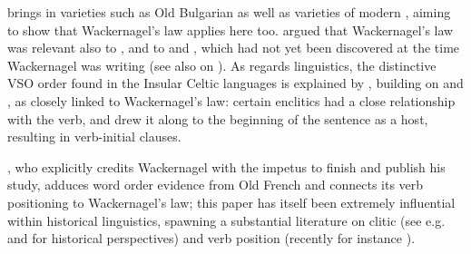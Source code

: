 \citet{Nilsson1904} brings in  varieties such as Old Bulgarian as well as varieties of modern , aiming to show that Wackernagel's law applies here too. 
\citet{Ivanov1958} argued that Wackernagel's law was relevant also to , and to  and , which had not yet been discovered at the time Wackernagel was writing (see also \citealp{Carruba1969,Hoffner1973,Garrett1990,Luraghi1998} on ). As regards  linguistics, the distinctive VSO order found in the Insular Celtic languages is explained by \citet{Watkins1963}, building on \citet{Vendryes1912} and \citet{Dillon1947}, as closely linked to Wackernagel's law: certain enclitics had a close relationship with the verb, and drew it along to the beginning of the sentence as a host, resulting in verb-initial clauses.

\citet{Thurneysen1892}, who explicitly credits Wackernagel with the impetus to finish and publish his study, adduces word order evidence from Old French and connects its verb positioning to Wackernagel's law; this paper has itself been extremely influential within historical  linguistics, spawning a substantial literature on clitic  (see e.g. \citealp{Wanner1987} and \citealp{Fontana1993} for historical perspectives) and verb position (recently for instance \citealp{Kaiser2002,Wolfe2018}). 

